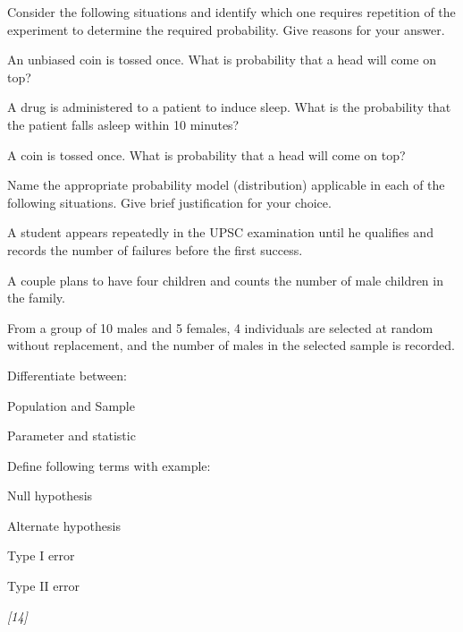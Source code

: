 \documentclass[11pt,a4paper]{article}
\newcommand{\pts}[1]{\hfill   \textit{[#1]}}
\begin{document}
\begin{parts}
  \item Consider the following situations and identify which one requires repetition of the experiment to determine the required probability. Give reasons for your answer.
  
\begin{parts}
    \item An unbiased coin is tossed once. What is probability that a head will come on top?
    \item A drug is administered to a patient to induce sleep. What is the probability that the patient falls asleep within 10 minutes?
    \item A coin is tossed once. What is probability that a head will come on top?
  \end{parts}
  \item Name the appropriate probability model (distribution) applicable in each of the following situations. Give brief justification for your choice.
  
\begin{parts}
    \item A student appears repeatedly in the UPSC examination until he qualifies and records the number of failures before the first success.
    \item A couple plans to have four children and counts the number of male children in the family.
    \item From a group of 10 males and 5 females, 4 individuals are selected at random without replacement, and the number of males in the selected sample is recorded.
  \end{parts}
  \item Differentiate between:
  
\begin{parts}
    \item Population and Sample
    \item Parameter and statistic
  \end{parts}
  \item Define following terms with example:
  
\begin{parts}
    \item Null hypothesis
    \item Alternate hypothesis
    \item Type I error
    \item Type II error
  \end{parts}
\end{parts}\pts{14}
\end{document}
